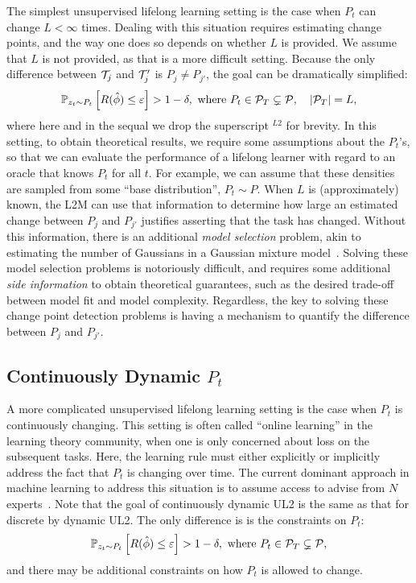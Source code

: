 \documentclass{article}
\begin{document}
The simplest unsupervised lifelong learning setting is the case when $P_t$ can change $L < \infty$ times.  Dealing with this situation requires estimating change points, and the way one does so depends on whether $L$ is provided.  We assume that $L$ is not provided, as that is a more difficult setting.  Because  the only difference between $\mathcal{T}_j$ and $\mathcal{T}_j'$ is $P_j \neq P_{j'}$, the goal can be dramatically simplified:
\begin{align} \label{eq:online}        
    \mathbb{P}_{ z_t \sim P_t} \left[R(\hat{\phi})  \leq \varepsilon \right] > 1 - \delta, \text{ where } P_t \in \mathcal{P}_T \subsetneq \mathcal{P}, \quad |\mathcal{P}_T| = L,
\end{align}
where here and in the sequal we drop the superscript $^{L2}$ for brevity. In this setting, to obtain theoretical results, we require some assumptions about the $P_t$'s, so that we can evaluate the performance of a lifelong learner with regard to an oracle that knows $P_t$ for all $t$.  For example, we can assume that these densities are sampled from some ``base distribution'', $P_t \sim P$. When $L$ is (approximately) known, the L2M can use that information to determine how large an estimated change between $P_j$ and $P_{j'}$ justifies asserting that the task has changed.  Without this information, there is an additional \emph{model selection} problem, akin to estimating the number of Gaussians in a Gaussian mixture model~\cite{Fraley2002-rm}.  Solving these model selection problems is notoriously difficult, and requires some additional \emph{side information} to obtain theoretical guarantees, such as the desired trade-off between model fit and model complexity.  Regardless, the key to solving these change point detection problems is having a mechanism to quantify the difference between $P_j$ and $P_{j'}$. 




\subsection{Continuously Dynamic $P_t$}
\label{sec:smooth}

A  more complicated unsupervised lifelong learning setting is the case when $P_t$ is continuously changing.  This setting is often called ``online learning'' in the learning theory community, when one is only concerned about loss on the subsequent tasks. Here, the learning rule must either explicitly or implicitly address the fact that $P_t$ is  changing over time.  The current dominant approach in machine learning to address this situation is to assume access to advise from $N$ experts~\cite{Mohri2018-tf}. Note that the goal of continuously dynamic UL2 is the same as that for discrete by dynamic UL2.  The only difference is is the constraints on $P_t$:
\begin{align} \label{eq:online}        
    \mathbb{P}_{ z_t \sim P_t} \left[R(\hat{\phi})  \leq \varepsilon \right] > 1 - \delta, \text{ where } P_t \in \mathcal{P}_T \subsetneq \mathcal{P}, 
\end{align}
and there may be additional constraints on how $P_t$ is allowed to change.
\end{document}
